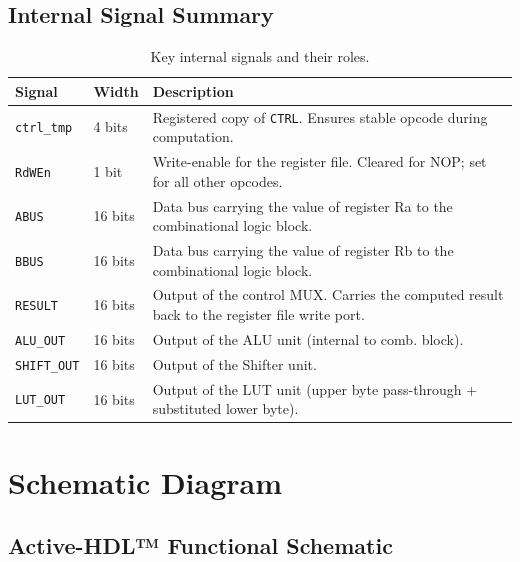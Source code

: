 \documentclass[12pt, a4paper]{report}
\begin{document}
\section{Internal Signal Summary}

\begin{table}[H]
\centering
\caption{Key internal signals and their roles.}
\label{tab:internal_signals}
\small
\begin{tabularx}{\textwidth}{@{}p{1.5cm} p{1.5cm} X@{}}\toprule
\textbf{Signal} & \textbf{Width} & \textbf{Description} \\
\midrule
\texttt{ctrl\_tmp}  & 4 bits  & Registered copy of \texttt{CTRL}.
                                  Ensures stable opcode during computation. \\
\texttt{RdWEn}      & 1 bit   & Write-enable for the register file.
                                  Cleared for NOP; set for all other opcodes. \\
\texttt{ABUS}       & 16 bits & Data bus carrying the value of register Ra
                                  to the combinational logic block. \\
\texttt{BBUS}       & 16 bits & Data bus carrying the value of register Rb
                                  to the combinational logic block. \\
\texttt{RESULT}     & 16 bits & Output of the control MUX. Carries the computed
                                  result back to the register file write port. \\
\texttt{ALU\_OUT}   & 16 bits & Output of the ALU unit (internal to comb. block). \\
\texttt{SHIFT\_OUT} & 16 bits & Output of the Shifter unit. \\
\texttt{LUT\_OUT}   & 16 bits & Output of the LUT unit (upper byte pass-through
                                  + substituted lower byte). \\
\bottomrule
\end{tabularx}
\normalsize
\end{table}

\chapter{Schematic Diagram}
  \vspace{-0.5cm}

\section{Active-HDL™ Functional Schematic}
\end{document}
